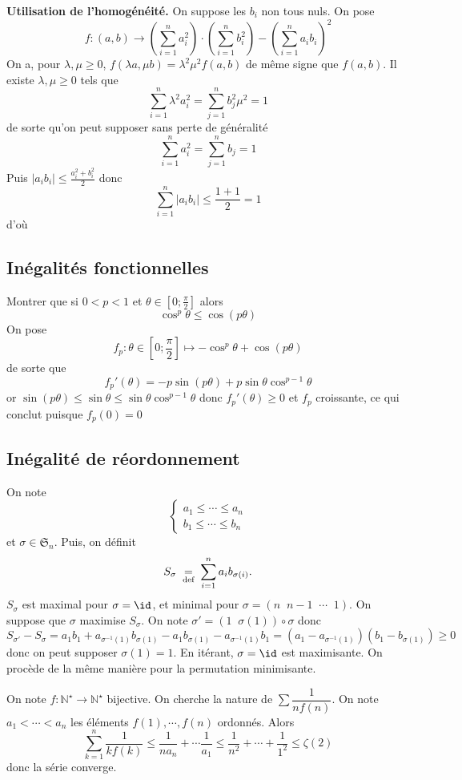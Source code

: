 \textbf{Utilisation de l'homogénéité.} On suppose les $b_i$ non tous nuls. On pose \[
    f:(a, b)\longrightarrow \left( \sum_{i=1}^na_i^2 \right) \cdot \left( \sum_{i=1}^n b_i^2 \right)- \left( \sum_{i=1}^na_ib_i \right)^2
\]
On a, pour $\lambda, \mu\geq 0$, $f(\lambda a, \mu b)=\lambda^2\mu^2f(a, b)$ de même signe que $f(a, b)$. Il existe $\lambda, \mu\geq 0$ tels que \[
    \sum_{i=1}^n \lambda^2a_i^2=\sum_{j=1}^nb_j^2\mu^2=1
\]
de sorte qu'on peut supposer sans perte de généralité \[
    \sum_{i=1}^na_i^2=\sum_{j=1}^n b_j=1
\]
Puis $|a_ib_i|\leq \frac{a_i^2+b_i^2}2$ donc \[
    \sum_{i=1}^n|a_ib_i|\leq \frac{1+1}2=1
\]
d'où \conc

\subsection{Inégalités fonctionnelles}

Montrer que si $0<p<1$ et $\theta\in \left[ 0; \frac\pi2 \right]$ alors \[
    \cos^p\theta\leq \cos(p\theta)
\]
On pose \[
    f_p:\theta\in \left[ 0;\frac\pi2 \right]\longmapsto -\cos^p\theta+\cos(p\theta)
\]
de sorte que \[
    f_p'(\theta)=-p\sin(p\theta)+p\sin\theta\cos^{p-1}\theta
\]
or $\sin(p\theta)\leq \sin\theta\leq \sin\theta\cos^{p-1}\theta$ donc $f_p'(\theta)\geq 0$ et $f_p$ croissante, ce qui conclut puisque $f_p(0)=0$

\subsection{Inégalité de réordonnement}

On note \[
    \begin{cases}
        a_1\leq \cdots \leq a_n\\ b_1\leq \cdots \leq b_n
    \end{cases}
\]
et $\sigma\in\mathfrak S_n$. Puis, on définit \[
    S_\sigma\;\underset{\text{def}}=\;\sum_{i=1}^na_ib_{\sigma(i)}.
\]
$S_\sigma$ est maximal pour $\sigma=\id$, et minimal pour $\sigma=(n\;\;n-1\;\;\cdots \;\; 1)$. On suppose que $\sigma$ maximise $S_\sigma$. On note $\sigma'=(1\;\;\sigma(1))\circ \sigma$ donc \[ S_{\sigma'}-S_\sigma=a_1b_1+a_{\sigma^{-1}(1)}b_{\sigma(1)}-a_1b_{\sigma(1)}-a_{\sigma^{-1}(1)}b_1 =(a_1-a_{\sigma^{-1}(1)})(b_1-b_{\sigma(1)})\geq 0\]
donc on peut supposer $\sigma(1)=1$. En itérant, $\sigma=\id$ est maximisante. On procède de la même manière pour la permutation minimisante.

\begin{ex}[Application 1]
    On note $f:\mathbb N^\star\to\mathbb N^\star$ bijective. On cherche la nature de $\sum\dfrac1{nf(n)}$.
    On note $a_1<\cdots <a_n$ les éléments $f(1), \cdots, f(n)$ ordonnés. Alors \[
        \sum_{k=1}^n\frac1{kf(k)}\leq \frac1{na_n}+\cdots \frac1{a_1}\leq \frac1{n^2}+\cdots +\frac1{1^2}\leq\zeta(2)
    \]
    donc la série converge.
\end{ex}

